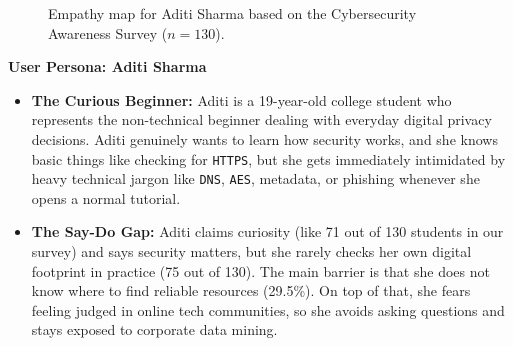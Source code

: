 \documentclass[11pt,a4paper]{article}
\begin{document}
\begin{figure}[!htbp]
{%
}
\caption{Empathy map for Aditi Sharma based on the Cybersecurity Awareness Survey ($n = 130$).}
\label{fig:empathy_map}
\end{figure}

\noindent
\textbf{User Persona: Aditi Sharma}
\begin{itemize}
    \item \textbf{The Curious Beginner:} Aditi is a 19-year-old college student who represents the non-technical beginner dealing with everyday digital privacy decisions. Aditi genuinely wants to learn how security works, and she knows basic things like checking for \texttt{HTTPS}, but she gets immediately intimidated by heavy technical jargon like \texttt{DNS}, \texttt{AES}, metadata, or phishing whenever she opens a normal tutorial.
    \item \textbf{The Say-Do Gap:} Aditi claims curiosity (like 71 out of 130 students in our survey) and says security matters, but she rarely checks her own digital footprint in practice (75 out of 130). The main barrier is that she does not know where to find reliable resources (29.5\%). On top of that, she fears feeling judged in online tech communities, so she avoids asking questions and stays exposed to corporate data mining.
\end{itemize}
\end{document}
